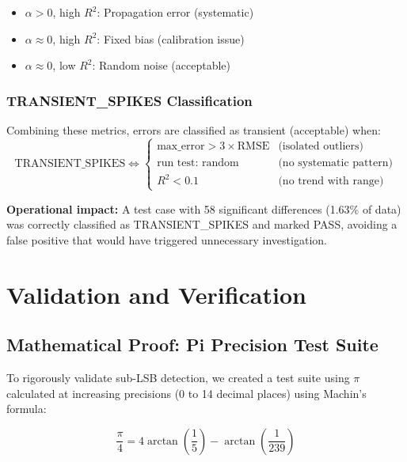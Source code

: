 \documentclass[11pt,letterpaper]{article}
\begin{document}
\begin{itemize}
    \item $\alpha > 0$, high $R^2$: Propagation error (systematic)
    \item $\alpha \approx 0$, high $R^2$: Fixed bias (calibration issue)
    \item $\alpha \approx 0$, low $R^2$: Random noise (acceptable)
\end{itemize}

\subsubsection{TRANSIENT\_SPIKES Classification}

Combining these metrics, errors are classified as transient (acceptable) when:
\begin{equation}
    \text{TRANSIENT\_SPIKES} \iff \begin{cases}
        \text{max\_error} > 3 \times \text{RMSE} & \text{(isolated outliers)} \\
        \text{run test: random} & \text{(no systematic pattern)} \\
        R^2 < 0.1 & \text{(no trend with range)}
    \end{cases}
\end{equation}

\noindent\textbf{Operational impact:} A test case with 58 significant differences (1.63\% of data) was correctly classified as TRANSIENT\_SPIKES and marked PASS, avoiding a false positive that would have triggered unnecessary investigation.

\section{Validation and Verification}
\label{sec:validation}

\subsection{Mathematical Proof: Pi Precision Test Suite}

To rigorously validate sub-LSB detection, we created a test suite using $\pi$ calculated at increasing precisions (0 to 14 decimal places) using Machin's formula:

\begin{equation}
    \frac{\pi}{4} = 4\arctan\left(\frac{1}{5}\right) - \arctan\left(\frac{1}{239}\right)
\end{equation}
\end{document}
